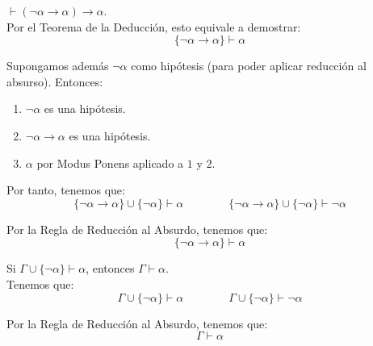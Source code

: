 \begin{ejercicio}\label{ej:1.17}
    $\vdash (\neg\alpha \rightarrow \alpha) \rightarrow \alpha$.\\

    Por el Teorema de la Deducción, esto equivale a demostrar:
    \begin{equation*}
        \{\neg\alpha\rightarrow\alpha\} \vdash \alpha
    \end{equation*}

    Supongamos además $\neg\alpha$ como hipótesis (para poder aplicar reducción al absurso). Entonces:
    \begin{enumerate}
        \item $\neg\alpha$ es una hipótesis.
        \item $\neg\alpha\rightarrow\alpha$ es una hipótesis.
        \item $\alpha$ por Modus Ponens aplicado a $1$ y $2$.
    \end{enumerate}

    Por tanto, tenemos que:
    \begin{equation*}
        \{\neg\alpha\rightarrow\alpha\}\cup \{\neg\alpha\} \vdash \alpha\qquad \qquad 
        \{\neg\alpha\rightarrow\alpha\}\cup \{\neg\alpha\} \vdash \neg\alpha
    \end{equation*}

    Por la Regla de Reducción al Absurdo, tenemos que:
    \begin{equation*}
        \{\neg\alpha\rightarrow\alpha\} \vdash \alpha
    \end{equation*}
\end{ejercicio}

\begin{ejercicio}\label{ej:1.18}
    Si $\Gamma \cup \{\neg\alpha\} \vdash \alpha$, entonces $\Gamma \vdash \alpha$.\\

    Tenemos que:
    \begin{equation*}
        \Gamma \cup \{\neg\alpha\} \vdash \alpha\qquad\qquad \Gamma \cup \{\neg\alpha\} \vdash \neg\alpha
    \end{equation*}

    Por la Regla de Reducción al Absurdo, tenemos que:
    \begin{equation*}
        \Gamma \vdash \alpha
    \end{equation*}
\end{ejercicio}

